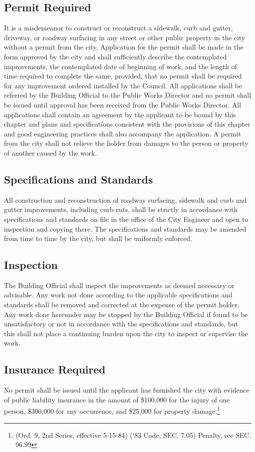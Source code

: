 \subsection{Permit Required}
It is a misdemeanor to construct or reconstruct a sidewalk, curb and gutter, driveway, or roadway surfacing in any street or other public property in the city without a permit from the city. Application for the permit shall be made in the form approved by the city and shall sufficiently describe the contemplated improvements, the contemplated date of beginning of work, and the length of time required to complete the same, provided, that no permit shall be required for any improvement ordered installed by the Council. All applications shall be referred by the Building Official to the Public Works Director and no permit shall be issued until approval has been received from the Public Works Director. All applications shall contain an agreement by the applicant to be bound by this chapter and plans and specifications consistent with the provisions of this chapter and good engineering practices shall also accompany the application. A permit from the city shall not relieve the holder from damages to the person or property of another caused by the work.
\subsection{Specifications and Standards}
All construction and reconstruction of roadway surfacing, sidewalk and curb and gutter improvements, including curb cuts, shall be strictly in accordance with specifications and standards on file in the office of the City Engineer and open to inspection and copying there.  The specifications and standards may be amended from time to time by the city, but shall be uniformly enforced.
\subsection{Inspection}
The Building Official shall inspect the improvements as deemed necessary or advisable.  Any work not done according to the applicable specifications and standards shall be removed and corrected at the expense of the permit holder.  Any work done hereunder may be stopped by the Building Official if found to be unsatisfactory or not in accordance with the specifications and standards, but this shall not place a continuing burden upon the city to inspect or supervise the work.
\subsection{Insurance Required}
No permit shall be issued until the applicant has furnished the city with evidence of public liability insurance in the amount of \$100,000 for the injury of one person, \$300,000 for any occurrence, and \$25,000 for property damage.\footnote{(Ord. 9, 2nd Series, effective 5-15-84)  (‘83 Code, SEC. 7.05)  Penalty, see SEC. 96.99}

